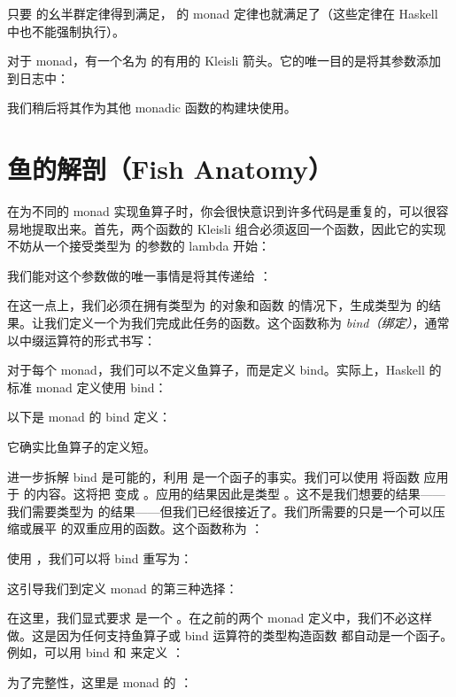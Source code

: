 只要  的幺半群定律得到满足， 的 monad 定律也就满足了（这些定律在 Haskell 中也不能强制执行）。

对于  monad，有一个名为  的有用的 Kleisli 箭头。它的唯一目的是将其参数添加到日志中：

我们稍后将其作为其他 monadic 函数的构建块使用。

\section{鱼的解剖（Fish Anatomy）}

在为不同的 monad 实现鱼算子时，你会很快意识到许多代码是重复的，可以很容易地提取出来。首先，两个函数的 Kleisli 组合必须返回一个函数，因此它的实现不妨从一个接受类型为  的参数的 lambda 开始：

我们能对这个参数做的唯一事情是将其传递给 ：

在这一点上，我们必须在拥有类型为  的对象和函数  的情况下，生成类型为  的结果。让我们定义一个为我们完成此任务的函数。这个函数称为 \emph{bind（绑定）}，通常以中缀运算符的形式书写：

对于每个 monad，我们可以不定义鱼算子，而是定义 bind。实际上，Haskell 的标准 monad 定义使用 bind：

以下是  monad 的 bind 定义：

它确实比鱼算子的定义短。

进一步拆解 bind 是可能的，利用  是一个函子的事实。我们可以使用  将函数  应用于  的内容。这将把  变成 。应用的结果因此是类型 。这不是我们想要的结果——我们需要类型为  的结果——但我们已经很接近了。我们所需要的只是一个可以压缩或展平  的双重应用的函数。这个函数称为 ：

使用 ，我们可以将 bind 重写为：

这引导我们到定义 monad 的第三种选择：

在这里，我们显式要求  是一个 。在之前的两个 monad 定义中，我们不必这样做。这是因为任何支持鱼算子或 bind 运算符的类型构造函数  都自动是一个函子。例如，可以用 bind 和  来定义 ：

为了完整性，这里是  monad 的 ：

